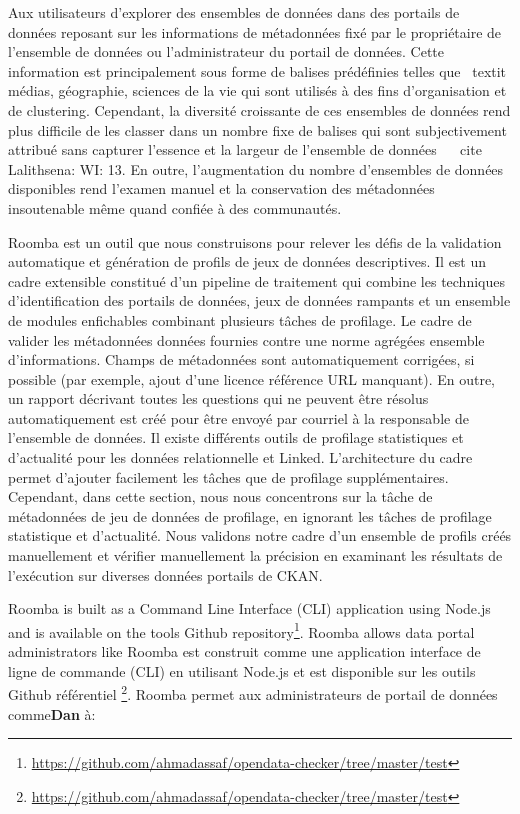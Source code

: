 \documentclass[a4paper,11pt,twoside]{ThesisStyle}
\begin{document}
Aux utilisateurs d'explorer des ensembles de données dans des portails de données reposant sur les informations de métadonnées fixé par le propriétaire de l'ensemble de données ou l'administrateur du portail de données. Cette information est principalement sous forme de balises prédéfinies telles que \ textit {médias, géographie, sciences de la vie} qui sont utilisés à des fins d'organisation et de clustering. Cependant, la diversité croissante de ces ensembles de données rend plus difficile de les classer dans un nombre fixe de balises qui sont subjectivement attribué sans capturer l'essence et la largeur de l'ensemble de données ~ \ cite {Lalithsena: WI: 13}. En outre, l'augmentation du nombre d'ensembles de données disponibles rend l'examen manuel et la conservation des métadonnées insoutenable même quand confiée à des communautés.

Roomba est un outil que nous construisons pour relever les défis de la validation automatique et génération de profils de jeux de données descriptives. Il est un cadre extensible constitué d'un pipeline de traitement qui combine les techniques d'identification des portails de données, jeux de données rampants et un ensemble de modules enfichables combinant plusieurs tâches de profilage. Le cadre de valider les métadonnées données fournies contre une norme agrégées ensemble d'informations. Champs de métadonnées sont automatiquement corrigées, si possible (par exemple, ajout d'une licence référence URL manquant). En outre, un rapport décrivant toutes les questions qui ne peuvent être résolus automatiquement est créé pour être envoyé par courriel à la responsable de l'ensemble de données. Il existe différents outils de profilage statistiques et d'actualité pour les données relationnelle et Linked. L'architecture du cadre permet d'ajouter facilement les tâches que de profilage supplémentaires. Cependant, dans cette section, nous nous concentrons sur la tâche de métadonnées de jeu de données de profilage, en ignorant les tâches de profilage statistique et d'actualité. Nous validons notre cadre d'un ensemble de profils créés manuellement et vérifier manuellement la précision en examinant les résultats de l'exécution sur diverses données portails de CKAN.

Roomba is built as a Command Line Interface (CLI) application using Node.js and is available on the tools Github repository\footnote{\url{https://github.com/ahmadassaf/opendata-checker/tree/master/test}}. Roomba allows data portal administrators like Roomba est construit comme une application interface de ligne de commande (CLI) en utilisant Node.js et est disponible sur les outils Github référentiel \footnote{\url{https://github.com/ahmadassaf/opendata-checker/tree/master/test}}. Roomba permet aux administrateurs de portail de données comme\textbf{Dan} à:
\end{document}
